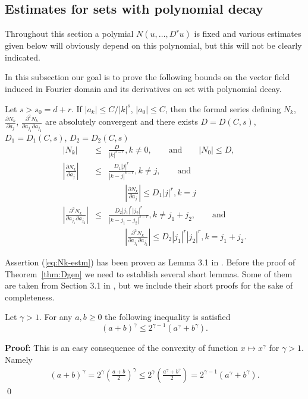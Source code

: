 \subsection{Estimates for sets with polynomial decay}




Throughout this section a polymial $N(u,\dots,D^r u)$ is fixed  and various estimates given below will obviously depend on this polynomial, but this will not be clearly
indicated.

In this subsection our goal is to prove the following bounds on the vector field induced in Fourier domain and its derivatives on set with polynomial decay.
\begin{theorem}
\label{thm:Dgen}
 Let $s > s_0=d+r$.
 If $|a_k| \leq C/|k|^s$, $|a_0| \leq C$, then  the formal series defining $N_k$, $\frac{\partial N_k}{\partial a_j}$, $\frac{\partial^2 N_k}{\partial a_{j_1} \partial a_{j_2}}$
 are absolutely convergent and
there exists $D=D(C,s)$, $D_1=D_1(C,s)$, $D_2=D_2(C,s)$
\begin{eqnarray}
  |N_k| &\leq& \frac{D}{|k|^{s-r}}, k \neq 0, \qquad \mbox{and} \qquad |N_0| \leq D,  \label{eq:Nk-estm} \\
  \left|\frac{\partial N_k}{\partial a_j}\right| &\leq& \frac{D_1 |j|^r}{|k-j|^{s-r}},  k \neq j, \qquad \mbox{and} \nonumber \\
     & &  \qquad \left|\frac{\partial N_k}{\partial a_j}\right|  \leq D_1|j|^r, k=j \label{eq:derNk-estm} \\
   \left|\frac{\partial^2 N_k}{\partial a_{j_1} \partial a_{j_2}}\right| &\leq& \frac{D_2 |j_1|^r |j_2|^r}{|k-j_1-j_2|^{s-r}},   k \neq j_1+j_2, \qquad \mbox{and} \nonumber \\
     & & \qquad   \left|\frac{\partial^2 N_k}{\partial a_{j_1} \partial a_{j_2}}\right|  \leq D_2 |j_1|^r |j_2|^r, k=j_1+j_2.  \label{eq:derNk2-estm}
\end{eqnarray}
\end{theorem}
Assertion (\ref{eq:Nk-estm}) has been proven as Lemma 3.1 in \cite{ZKS3}.
Before the proof of Theorem~\ref{thm:Dgen} we need to establish several short lemmas. Some of them are taken from Section 3.1 in \cite{ZKS3}, but we include
their short proofs for the sake of completeness.

\begin{lemma} \cite[Lemma 3.2]{ZKS3}
\label{lem:powineq}
  Let $\gamma > 1$. For any $a,b \geq 0$ the following inequality
  is satisfied
\begin{equation*}
  (a+b)^\gamma \leq 2^{\gamma-1}(a^\gamma + b^\gamma). %
\end{equation*}
\end{lemma}
\textbf{Proof:} This is an easy consequence of the convexity of
function $x \mapsto x^\gamma$ for $\gamma >1$. Namely
\begin{eqnarray*}
  (a+b)^\gamma = 2^\gamma \left(\frac{a + b}{2}\right)^\gamma \leq 2^\gamma \left(\frac{a^\gamma +
  b^\gamma}{2}\right)= 2^{\gamma-1} (a^\gamma + b^\gamma).
\end{eqnarray*}
\qed






